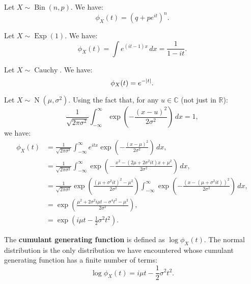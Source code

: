 \documentclass{huhtakm-template-book-v2}
\DeclareMathOperator{\Bin}{Bin}
\DeclareMathOperator{\Exp}{Exp}
\DeclareMathOperator{\N}{N}
\DeclareMathOperator{\Cauchy}{Cauchy}
\begin{document}
    \begin{eg}
        Let $X \sim \Bin(n,p)$. We have:
        \begin{equation*}
            \phi_{X}(t) = (q+pe^{it})^{n}.
        \end{equation*}
    \end{eg}
    \begin{eg}
        Let $X \sim \Exp(1)$. We have:
        \begin{equation*}
            \phi_{X}(t) = \int e^{(it-1)x}\,dx = \frac{1}{1-it}.
        \end{equation*}
    \end{eg}
    \begin{eg}
        Let $X \sim \Cauchy$. We have:
        \begin{equation*}
            \phi_{X}(t) = e^{-\left|{t}\right|}.
        \end{equation*}
    \end{eg}
    \begin{eg}
        Let $X \sim \N(\mu,\sigma^{2})$. Using the fact that, for any $u \in \mathbb{C}$ (not just in $\mathbb{R}$):
        \begin{equation*}
            \frac{1}{\sqrt{2\pi\sigma^{2}}}\int_{-\infty}^{\infty}\exp\left(-\frac{(x-u)^{2}}{2\sigma^{2}}\right)\,dx = 1,
        \end{equation*}
        we have:
        \begin{align*}
            \phi_{X}(t) &= \frac{1}{\sqrt{2\pi\sigma^{2}}}\int_{-\infty}^{\infty}e^{itx}\exp\left(-\frac{(x-\mu)^{2}}{2\sigma^{2}}\right)\,dx,\\
            &= \frac{1}{\sqrt{2\pi\sigma^{2}}}\int_{-\infty}^{\infty}\exp\left(-\frac{x^{2}-(2\mu+2\sigma^{2}it)x+\mu^{2}}{2\sigma^{2}}\right)\,dx,\\
            &= \frac{1}{\sqrt{2\pi\sigma^{2}}}\exp\left(\frac{(\mu+\sigma^{2}it)^{2}-\mu^{2}}{2\sigma^{2}}\right)\int_{-\infty}^{\infty}\exp\left(-\frac{(x-(\mu+\sigma^{2}it))^{2}}{2\sigma^{2}}\right)\,dx,\\
            &= \exp\left(\frac{\mu^{2}+2\sigma^{2}i\mu t-\sigma^{4}t^{2}-\mu^{2}}{2\sigma^{2}}\right),\\
            &= \exp\left(i\mu t-\frac{1}{2}\sigma^{2}t^{2}\right).
        \end{align*}
    \end{eg}
    \begin{rem}
        The \textbf{cumulant generating function} is defined as $\log\phi_{X}(t)$. The normal distribution is the only distribution we have encountered whose cumulant generating function has a finite number of terms:
        \begin{equation*}
            \log\phi_{X}(t) = i\mu t-\frac{1}{2}\sigma^{2}t^{2}.
        \end{equation*}
    \end{rem}
    \newpage
\end{document}
